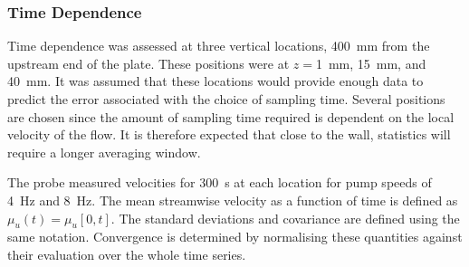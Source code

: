 \documentclass[12pt,oneside,a4paper]{article}
\begin{document}
\subsubsection{Time Dependence}


Time dependence was assessed at three vertical locations, \SI{400}{mm} from the upstream end of the plate. These positions were at $z=$\SI{1}{mm}, \SI{15}{mm}, and \SI{40}{mm}. It was assumed that these locations would provide enough data to predict the error associated with the choice of sampling time. Several positions are chosen since the amount of sampling time required is dependent on the local velocity of the flow. It is therefore expected that close to the wall, statistics will require a longer averaging window.

 The probe measured velocities for \SI{300}{s} at each location for pump speeds of \SI{4}{Hz} and \SI{8}{Hz}. The mean streamwise velocity as a function of time is defined as $\mu_u (t) = \mu_u[0,t]$. The standard deviations and covariance are defined using the same notation. Convergence is determined by normalising these quantities against their evaluation over the whole time series.
\end{document}
